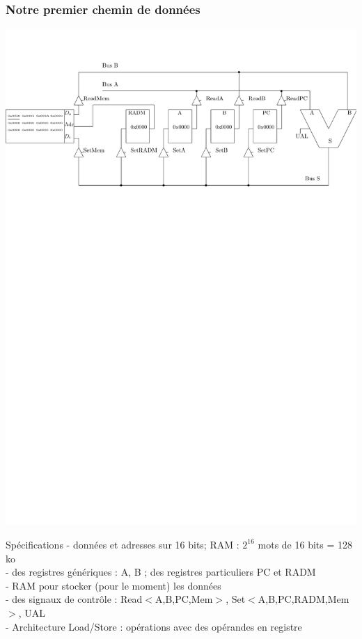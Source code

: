 \documentclass{beamer}
\begin{document}
\begin{frame}
\frametitle{Notre premier chemin de données}

\centering\includegraphics[width=0.9\columnwidth]{Figs/premier_chemin.pdf}

\begin{tiny}
\begin{block}{Spécifications}
- données et adresses sur 16 bits; RAM : $2^{16}$ mots de 16 bits = 128 ko\\
- des registres génériques : A, B ; des registres particuliers PC et RADM\\
- RAM pour stocker (pour le moment) les données\\
- des signaux de contrôle : Read$<$A,B,PC,Mem$>$, Set$<$A,B,PC,RADM,Mem$>$, UAL\\
- Architecture Load/Store : opérations avec des opérandes en registre
\end{block}
\end{tiny}
\end{frame}
\end{document}

